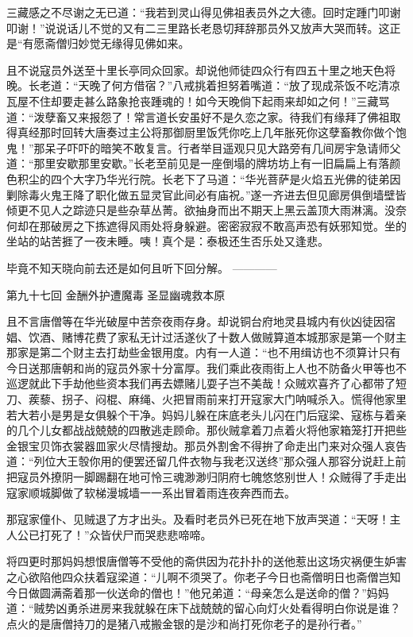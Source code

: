 \documentclass[12pt,UTF8]{ctexbook}
\begin{document}
{	三藏感之不尽谢之无已道：“我若到灵山得见佛祖表员外之大德。回时定踵门叩谢叩谢！”说说话儿不觉的又有二三里路长老恳切拜辞那员外又放声大哭而转。这正是“有愿斋僧归妙觉无缘得见佛如来。
	
	且不说寇员外送至十里长亭同众回家。却说他师徒四众行有四五十里之地天色将晚。长老道：“天晚了何方借宿？”八戒挑着担努着嘴道：“放了现成茶饭不吃清凉瓦屋不住却要走甚么路象抢丧踵魂的！如今天晚倘下起雨来却如之何！”三藏骂道：“泼孽畜又来报怨了！常言道长安虽好不是久恋之家。待我们有缘拜了佛祖取得真经那时回转大唐奏过主公将那御厨里饭凭你吃上几年胀死你这孽畜教你做个饱鬼！”那呆子吓吓的暗笑不敢复言。行者举目遥观只见大路旁有几间房宇急请师父道：“那里安歇那里安歇。”长老至前见是一座倒塌的牌坊坊上有一旧扁扁上有落颜色积尘的四个大字乃华光行院。长老下了马道：“华光菩萨是火焰五光佛的徒弟因剿除毒火鬼王降了职化做五显灵官此间必有庙祝。”遂一齐进去但见廊房俱倒墙壁皆倾更不见人之踪迹只是些杂草丛菁。欲抽身而出不期天上黑云盖顶大雨淋漓。没奈何却在那破房之下拣遮得风雨处将身躲避。密密寂寂不敢高声恐有妖邪知觉。坐的坐站的站苦捱了一夜未睡。咦！真个是：泰极还生否乐处又逢悲。
	
	毕竟不知天晓向前去还是如何且听下回分解。
	------------
	
	第九十七回 金酬外护遭魔毒 圣显幽魂救本原
	
	且不言唐僧等在华光破屋中苦奈夜雨存身。却说铜台府地灵县城内有伙凶徒因宿娼、饮酒、赌博花费了家私无计过活遂伙了十数人做贼算道本城那家是第一个财主那家是第二个财主去打劫些金银用度。内有一人道：“也不用缉访也不须算计只有今日送那唐朝和尚的寇员外家十分富厚。我们乘此夜雨街上人也不防备火甲等也不巡逻就此下手劫他些资本我们再去嫖赌儿耍子岂不美哉！众贼欢喜齐了心都带了短刀、蒺藜、拐子、闷棍、麻绳、火把冒雨前来打开寇家大门呐喊杀入。慌得他家里若大若小是男是女俱躲个干净。妈妈儿躲在床底老头儿闪在门后寇梁、寇栋与着亲的几个儿女都战战兢兢的四散逃走顾命。那伙贼拿着刀点着火将他家箱笼打开把些金银宝贝饰衣裳器皿家火尽情搜劫。那员外割舍不得拚了命走出门来对众强人哀告道：“列位大王彀你用的便罢还留几件衣物与我老汉送终”那众强人那容分说赶上前把寇员外撩阴一脚踢翻在地可怜三魂渺渺归阴府七魄悠悠别世人！众贼得了手走出寇家顺城脚做了软梯漫城墙一一系出冒着雨连夜奔西而去。
	
	那寇家僮仆、见贼退了方才出头。及看时老员外已死在地下放声哭道：“天呀！主人公已打死了！”众皆伏尸而哭悲悲啼啼。
	
	将四更时那妈妈想恨唐僧等不受他的斋供因为花扑扑的送他惹出这场灾祸便生妒害之心欲陷他四众扶着寇梁道：“儿啊不须哭了。你老子今日也斋僧明日也斋僧岂知今日做圆满斋着那一伙送命的僧也！”他兄弟道：“母亲怎么是送命的僧？”妈妈道：“贼势凶勇杀进房来我就躲在床下战兢兢的留心向灯火处看得明白你说是谁？点火的是唐僧持刀的是猪八戒搬金银的是沙和尚打死你老子的是孙行者。”
	
}
\end{document}
